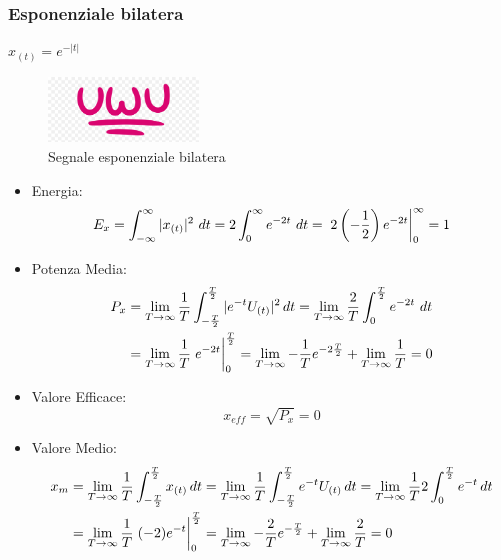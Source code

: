         \pagebreak
        \subsubsection{Esponenziale bilatera}
        $x_{(t)} = e^{-|t|}$
        \begin{figure}[H]
            \centering
            \includegraphics[width=4cm]{media/uwu.png}
            \caption{Segnale esponenziale bilatera}
            \label{fig:segnale esponenziale bilatera}
        \end{figure}        
        \begin{itemize}
            \item {Energia:
                \[
                    E_{x} = \int_{-\infty}^{\infty} |x_{(t)}|^2 \ dt =2 \int_{0}^{\infty} e^{-2t}\ dt = \eval*{2 \left(-\frac{1}{2}\right) e^{-2t}}_{0}^{\infty} = 1 
                \]
            }
            \item {Potenza Media:
                \begin{align}
                    P_{x} & =\lim_{T\rightarrow\infty}  \frac{1}{T} \int_{-\frac{T}{2}}^{\frac{T}{2}}  |e^{-t}U_{(t)}|^2 \,dt =\lim_{T\rightarrow\infty} \frac{2}{T} \int_{0}^{\frac{T}{2}} e^{-2t}\ dt \nonumber \\
                          & = \lim_{T\rightarrow\infty} \frac{1}{T} \eval*{e^{-2t}}_{0}^{\frac{T}{2}} =\lim_{T\rightarrow\infty}-\frac{1}{T} e^{-2\frac{T}{2}} + \lim_{T\rightarrow\infty} \frac{1}{T} = 0 \nonumber 
                \end{align}
            }
            \item {Valore Efficace:
                \[
                    x_{eff} = \sqrt{P_{x}} = 0 
                \]
            }
            \item {Valore Medio:
                    \begin{align}
                        x_{m} & = \lim_{T\rightarrow\infty} \frac{1}{T} \int_{-\frac{T}{2}}^{\frac{T}{2}}  x_{(t)} \,dt =\lim_{T\rightarrow\infty} \frac{1}{T} \int_{-\frac{T}{2}}^{\frac{T}{2}} e^{-t}U_{(t)}\,dt = \lim_{T\rightarrow\infty} \frac{1}{T} 2\int_{0}^{\frac{T}{2}} e^{-t}\,dt \nonumber \\
                              & = \lim_{T\rightarrow\infty} \frac{1}{T} \eval*{(-2) e^{-t}}_{0}^{\frac{T}{2}} =  \lim_{T\rightarrow\infty}-\frac{2}{T} e^{-\frac{T}{2}} + \lim_{T\rightarrow\infty} \frac{2}{T} = 0 \nonumber
                    \end{align}
            }
        \end{itemize}        

